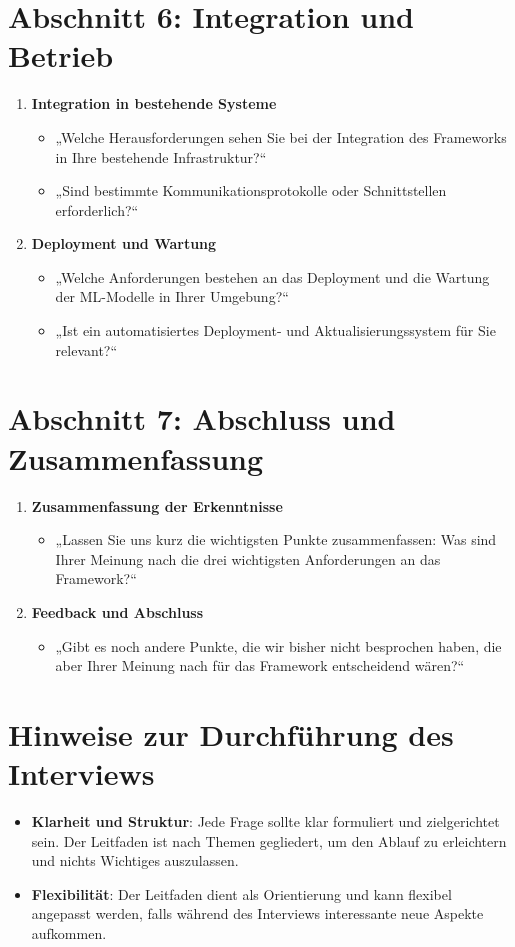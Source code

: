 \section*{Abschnitt 6: Integration und Betrieb}
\begin{enumerate}
    \item \textbf{Integration in bestehende Systeme}
    \begin{itemize}
        \item „Welche Herausforderungen sehen Sie bei der Integration des Frameworks in Ihre bestehende Infrastruktur?“
        \item „Sind bestimmte Kommunikationsprotokolle oder Schnittstellen erforderlich?“
    \end{itemize}
    \item \textbf{Deployment und Wartung}
    \begin{itemize}
        \item „Welche Anforderungen bestehen an das Deployment und die Wartung der ML-Modelle in Ihrer Umgebung?“
        \item „Ist ein automatisiertes Deployment- und Aktualisierungssystem für Sie relevant?“
    \end{itemize}
\end{enumerate}

\section*{Abschnitt 7: Abschluss und Zusammenfassung}
\begin{enumerate}
    \item \textbf{Zusammenfassung der Erkenntnisse}
    \begin{itemize}
        \item „Lassen Sie uns kurz die wichtigsten Punkte zusammenfassen: Was sind Ihrer Meinung nach die drei wichtigsten Anforderungen an das Framework?“
    \end{itemize}
    \item \textbf{Feedback und Abschluss}
    \begin{itemize}
        \item „Gibt es noch andere Punkte, die wir bisher nicht besprochen haben, die aber Ihrer Meinung nach für das Framework entscheidend wären?“
\end{itemize}
\end{enumerate}

\section*{Hinweise zur Durchführung des Interviews}
\begin{itemize}
    \item \textbf{Klarheit und Struktur}: Jede Frage sollte klar formuliert und zielgerichtet sein. Der Leitfaden ist nach Themen gegliedert, um den Ablauf zu erleichtern und nichts Wichtiges auszulassen.
    \item \textbf{Flexibilität}: Der Leitfaden dient als Orientierung und kann flexibel angepasst werden, falls während des Interviews interessante neue Aspekte aufkommen.
 \end{itemize}
